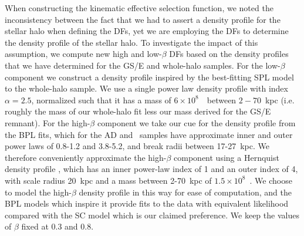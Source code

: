 When constructing the kinematic effective selection function, we noted the inconsistency between the fact that we had to assert a density profile for the stellar halo when defining the DFs, yet we are employing the DFs to determine the density profile of the stellar halo. To investigate the impact of this assumption, we compute new high and low-$\beta$ DFs based on the density profiles that we have determined for the GS/E and whole-halo samples. For the low-$\beta$ component we construct a density profile inspired by the best-fitting SPL model to the whole-halo sample. We use a single power law density profile with index $\alpha=2.5$, normalized such that it has a mass of $6\times10^{8}$~\Msun\ between $2-70$~kpc (i.e. roughly the mass of our whole-halo fit less our mass derived for the GS/E remnant). For the high-$\beta$ component we take our cue for the density profile from the BPL fits, which for the AD and \eLz\ samples have approximate inner and outer power laws of 0.8-1.2 and 3.8-5.2, and break radii between 17-27~kpc. We therefore conveniently approximate the high-$\beta$ component using a Hernquist density profile \parencite{hernquist90}, which has an inner power-law index of 1 and an outer index of 4, with scale radius 20~kpc and a mass between 2-70~kpc of $1.5\times10^{8}$~\Msun. We choose to model the high-$\beta$ density profile in this way for ease of computation, and the BPL models which inspire it provide fits to the data with equivalent likelihood compared with the SC model which is our claimed preference. We keep the values of $\beta$ fixed at 0.3 and 0.8.

